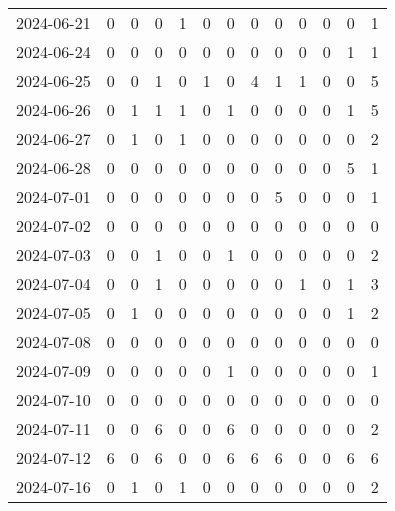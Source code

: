 \documentclass[dvipdfmx,oneside]{article}
\begin{document}
\begin{longtable}{lcccccccccccc}
        2024-06-21 &     0 &     0 &     0 &     1 &     0 &     0 &     0 &     0 &     0 &     0 &     0 &      1 \\
        2024-06-24 &     0 &     0 &     0 &     0 &     0 &     0 &     0 &     0 &     0 &     0 &     1 &      1 \\
        2024-06-25 &     0 &     0 &     1 &     0 &     1 &     0 &     4 &     1 &     1 &     0 &     0 &      5 \\
        2024-06-26 &     0 &     1 &     1 &     1 &     0 &     1 &     0 &     0 &     0 &     0 &     1 &      5 \\
        2024-06-27 &     0 &     1 &     0 &     1 &     0 &     0 &     0 &     0 &     0 &     0 &     0 &      2 \\
        2024-06-28 &     0 &     0 &     0 &     0 &     0 &     0 &     0 &     0 &     0 &     0 &     5 &      1 \\
        2024-07-01 &     0 &     0 &     0 &     0 &     0 &     0 &     0 &     5 &     0 &     0 &     0 &      1 \\
        2024-07-02 &     0 &     0 &     0 &     0 &     0 &     0 &     0 &     0 &     0 &     0 &     0 &      0 \\
        2024-07-03 &     0 &     0 &     1 &     0 &     0 &     1 &     0 &     0 &     0 &     0 &     0 &      2 \\
        2024-07-04 &     0 &     0 &     1 &     0 &     0 &     0 &     0 &     0 &     1 &     0 &     1 &      3 \\
        2024-07-05 &     0 &     1 &     0 &     0 &     0 &     0 &     0 &     0 &     0 &     0 &     1 &      2 \\
        2024-07-08 &     0 &     0 &     0 &     0 &     0 &     0 &     0 &     0 &     0 &     0 &     0 &      0 \\
        2024-07-09 &     0 &     0 &     0 &     0 &     0 &     1 &     0 &     0 &     0 &     0 &     0 &      1 \\
        2024-07-10 &     0 &     0 &     0 &     0 &     0 &     0 &     0 &     0 &     0 &     0 &     0 &      0 \\
        2024-07-11 &     0 &     0 &     6 &     0 &     0 &     6 &     0 &     0 &     0 &     0 &     0 &      2 \\
        2024-07-12 &     6 &     0 &     6 &     0 &     0 &     6 &     6 &     6 &     0 &     0 &     6 &      6 \\
        2024-07-16 &     0 &     1 &     0 &     1 &     0 &     0 &     0 &     0 &     0 &     0 &     0 &      2 \\

\end{longtable}
\end{document}
